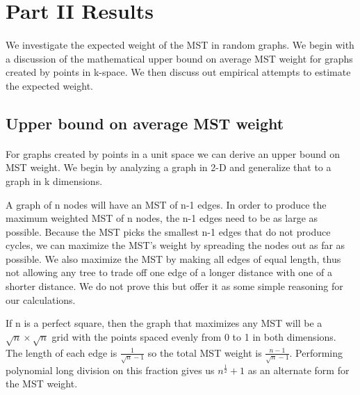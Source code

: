 \section{Part II Results}
\label{sec:part2}

\paragraph{}
We investigate the expected weight of the MST in random graphs. We begin
with a discussion of the mathematical upper bound on average MST weight for graphs
created by points in k-space. We then discuss out empirical attempts to
estimate the expected weight.


\subsection{Upper bound on average MST weight}
\paragraph{}
For graphs created by points in a unit space we can derive an upper bound on
MST weight. We begin by analyzing a graph in 2-D and generalize that to a
graph in k dimensions.

A graph of n nodes will have an MST of n-1 edges. In order to produce
the maximum weighted MST of n nodes, the n-1 edges need to be as large as
possible. Because the MST picks the smallest n-1 edges that do not produce
cycles, we can maximize the MST's weight by spreading the nodes out as far
as possible. We also maximize the MST by making all edges of equal length,
thus not allowing any tree to trade off one edge of a longer distance with
one of a shorter distance. We do not prove this but offer it as some
simple reasoning for our calculations.

If n is a perfect square, then the graph that
maximizes any MST will be a $\sqrt{n} \times \sqrt{n}$ grid with the
points spaced evenly from 0 to 1 in both dimensions. The length of each
edge is $\frac{1}{\sqrt{n}-1}$ so the total MST weight is
$\frac{n-1}{\sqrt{n}-1}$. Performing polynomial long division on this
fraction gives us $n^{\frac{1}{2}}+1$ as an alternate form for the MST
weight.

